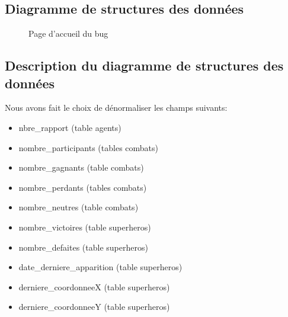 \documentclass{article}[12pt]
\begin{document}
	\subsection{Diagramme de structures des données}
	\begin{figure}[H]
		\centering
		\caption{Page d'accueil du bug}
	\end{figure}
    \newpage
	\subsection{Description du diagramme de structures des données}
	\label{dsd}
	Nous avons fait le choix de dénormaliser les champs suivants: 
	\begin{itemize}
		\item nbre\_rapport (table agents)
		\item nombre\_participants (tables combats)
		\item nombre\_gagnants (table combats)
		\item nombre\_perdants (tables combats)
		\item nombre\_neutres (table combats)
		\item nombre\_victoires (table superheros)
		\item nombre\_defaites (table superheros)
		\item date\_derniere\_apparition (table superheros)
		\item derniere\_coordonneeX (table superheros) 	
		\item derniere\_coordonneeY (table superheros) 	
	\end{itemize}
\end{document}
